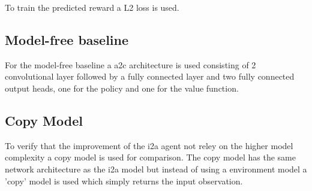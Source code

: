To train the predicted reward a L2 loss is used.
 
\subsection{Model-free baseline}

For the model-free baseline a a2c architecture is used consisting of 2 convolutional layer followed by a fully connected layer and two fully connected output heads, one for the policy and one for the value function.

\subsection{Copy Model}

To verify that the improvement of the i2a agent not reley on the higher model complexity a copy model is used for comparison. The copy model has the same network architecture as the i2a model but instead of using a environment model a 'copy' model is used which simply returns the input observation. 